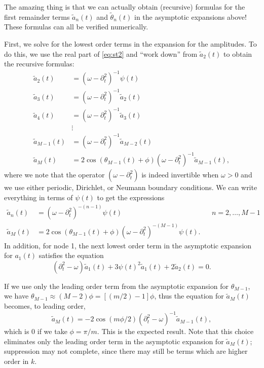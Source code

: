 \documentclass[11pt,reqno]{amsart}
\begin{document}
The amazing thing is that we can actually obtain (recursive) formulas for the first remainder terms $\tilde{a}_n(t)$ and $\tilde{\theta}_n(t)$ in the asymptotic expansions above! These formulas can all be verified numerically. 

First, we solve for the lowest order terms in the expansion for the amplitudes. To do this, we use the real part of \cref{eq:st2} and ``work down'' from $\tilde{a}_2(t)$ to obtain the recursive formulas:
\begin{align*}
\tilde{a}_2(t) &= (\omega - \partial_t^2)^{-1} \psi(t) \\
\tilde{a}_3(t) &= (\omega - \partial_t^2)^{-1} \tilde{a}_2(t) \\
\tilde{a}_4(t) &= (\omega - \partial_t^2)^{-1} \tilde{a}_3(t) \\
&\vdots \\
\tilde{a}_{M-1}(t) &= (\omega - \partial_t^2)^{-1} \tilde{a}_{M-2}(t) \\
\tilde{a}_{M}(t) &= 2 \cos( \theta_{M-1}(t) + \phi )(\omega - \partial_t^2)^{-1} \tilde{a}_{M-1}(t),
\end{align*}
where we note that the operator $(\omega - \partial_t^2)$ is indeed invertible when $\omega > 0$ and we use either periodic, Dirichlet, or Neumann boundary conditions. We can write everything in terms of $\psi(t)$ to get the expressions
\begin{align*}
\tilde{a}_n(t)   &= (\omega - \partial_t^2)^{-(n-1)} \psi(t) && n = 2, \dots, M-1 \\
\tilde{a}_{M}(t) &= 2 \cos( \theta_{M-1}(t) + \phi )(\omega - \partial_t^2)^{-(M-1)} \psi(t).
\end{align*}
In addition, for node 1, the next lowest order term in the asymptotic expansion for $a_1(t)$ satisfies the equation
\[
(\partial_t^2 - \omega)\tilde{a}_1(t) + 3 \psi(t)^2 \tilde{a}_1(t) + 2 \tilde{a}_2(t) = 0.
\]

If we use only the leading order term from the asymptotic expansion for $\theta_{M-1}$, we have $\theta_{M-1} \approx (M-2) \phi = [(m/2)-1] \phi$, thus the equation for $\tilde{a}_{M}(t)$ becomes, to leading order,
\[
\tilde{a}_{M}(t) = -2 \cos( m \phi/2 )(\partial_t^2 - \omega)^{-1} \tilde{a}_{M-1}(t),
\]
which is 0 if we take $\phi = \pi/m$. This is the expected result. Note that this choice eliminates only the leading order term in the asymptotic expansion for $\tilde{a}_{M}(t)$; suppression may not complete, since there may still be terms which are higher order in $k$.
\end{document}

